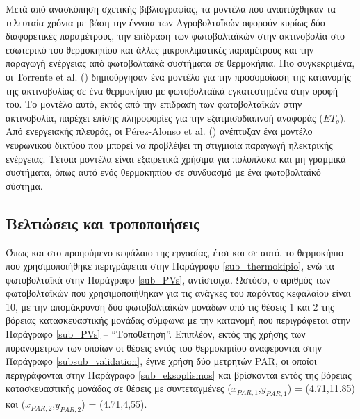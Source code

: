 \documentclass[12pt, a4paper]{report} %
\newcommand{\english}{\foreignlanguage{english}}
\begin{document}
Μετά από ανασκόπηση σχετικής βιβλιογραφίας, τα μοντέλα που αναπτύχθηκαν τα τελευταία χρόνια με βάση την έννοια των Αγροβολταϊκών 
αφορούν κυρίως δύο διαφορετικές παραμέτρους, την επίδραση των φωτοβολταϊκών στην ακτινοβολία στο εσωτερικό του θερμοκηπίου και 
άλλες μικροκλιματικές παραμέτρους και την παραγωγή ενέργειας από φωτοβολταϊκά συστήματα σε θερμοκήπια. Πιο συγκεκριμένα, οι
\english{Torrente et al.} (\citeyear{alg_adv_bib1}) δημιούργησαν ένα μοντέλο για την προσομοίωση της κατανομής της ακτινοβολίας 
σε ένα θερμοκήπιο με φωτοβολταϊκά εγκατεστημένα στην οροφή του. Το μοντέλο αυτό, εκτός από την επίδραση των φωτοβολταϊκών στην 
ακτινοβολία, παρέχει επίσης πληροφορίες για την εξατμισοδιαπνοή αναφοράς (\english{$ET_o$}). Από ενεργειακής πλευράς, οι 
\english{Pérez-Alonso et al.} (\citeyear{alg_adv_bib2}) ανέπτυξαν ένα μοντέλο νευρωνικού δικτύου που μπορεί να προβλέψει τη 
στιγμιαία παραγωγή ηλεκτρικής ενέργειας. Τέτοια μοντέλα είναι εξαιρετικά χρήσιμα για πολύπλοκα και μη γραμμικά συστήματα, 
όπως αυτό ενός θερμοκηπίου σε συνδυασμό με ένα φωτοβολταϊκό σύστημα.

\subsection{Βελτιώσεις και τροποποιήσεις}\label{sub_alg_advanc_improves}
Όπως και στο προηούμενο κεφάλαιο της εργασίας, έτσι και σε αυτό, το θερμοκήπιο που χρησιμοποιήθηκε περιγράφεται στην Παράγραφο 
\ref{sub_thermokipio}, ενώ τα φωτοβολταϊκά στην Παράγραφο \ref{sub_PVs}, αντίστοιχα. Ωστόσο, ο αριθμός των φωτοβολταϊκών που 
χρησιμοποιήθηκαν για τις ανάγκες του παρόντος κεφαλαίου είναι 10, με την απομάκρυνση δύο φωτοβολταϊκών μονάδων από τις θέσεις 1 και 2 
της βόρειας κατασκευαστικής μονάδας σύμφωνα με την κατανομή που περιγράφεται στην Παράγραφο \ref{sub_PVs} – “Τοποθέτηση”. Επιπλέον, 
εκτός της χρήσης των πυρανομέτρων των οποίων οι θέσεις εντός του θερμοκηπίου αναφέρονται στην Παράγραφο \ref{subsub_validation}, 
έγινε χρήση δύο μετρητών \english{PAR}, οι οποίοι περιγράφονται στην Παράγραφο \ref{sub_eksoplismos} και βρίσκονται εντός της βόρειας 
κατασκευαστικής μονάδας σε θέσεις με συντεταγμένες (\english{$x_{PAR,1}$,$y_{PAR,1}$}) = (4.71,11.85) και 
(\english{$x_{PAR,2}$,$y_{PAR,2}$}) = (4.71,4,55).
\end{document}
